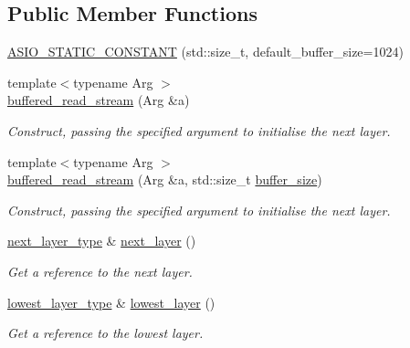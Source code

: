 \subsection*{Public Member Functions}
\begin{DoxyCompactItemize}
\item 
\hyperlink{classasio_1_1buffered__read__stream_a7a7cb4bdb0748fc23cd2cc8d16113d1c}{A\+S\+I\+O\+\_\+\+S\+T\+A\+T\+I\+C\+\_\+\+C\+O\+N\+S\+T\+A\+N\+T} (std\+::size\+\_\+t, default\+\_\+buffer\+\_\+size=1024)
\item 
{\footnotesize template$<$typename Arg $>$ }\\\hyperlink{classasio_1_1buffered__read__stream_a757e3802dbcd57836a744479fd5dc1f1}{buffered\+\_\+read\+\_\+stream} (Arg \&a)
\begin{DoxyCompactList}\small\item\em Construct, passing the specified argument to initialise the next layer. \end{DoxyCompactList}\item 
{\footnotesize template$<$typename Arg $>$ }\\\hyperlink{classasio_1_1buffered__read__stream_a5c3e4794b3e4e9a2ec17f0f045191dc3}{buffered\+\_\+read\+\_\+stream} (Arg \&a, std\+::size\+\_\+t \hyperlink{group__buffer__size_gabe8b5f116fbb66004b6d0ba8ee39c3d5}{buffer\+\_\+size})
\begin{DoxyCompactList}\small\item\em Construct, passing the specified argument to initialise the next layer. \end{DoxyCompactList}\item 
\hyperlink{classasio_1_1buffered__read__stream_a9f1f181db6c3207bd4c1c8fe6642d531}{next\+\_\+layer\+\_\+type} \& \hyperlink{classasio_1_1buffered__read__stream_a49445958f63af16e7f909dd45405bc11}{next\+\_\+layer} ()
\begin{DoxyCompactList}\small\item\em Get a reference to the next layer. \end{DoxyCompactList}\item 
\hyperlink{classasio_1_1buffered__read__stream_a041a7cecfeb013857bd1839dcd43de49}{lowest\+\_\+layer\+\_\+type} \& \hyperlink{classasio_1_1buffered__read__stream_ae9f3cde1deefd642768b2b4fe808774c}{lowest\+\_\+layer} ()
\begin{DoxyCompactList}\small\item\em Get a reference to the lowest layer. \end{DoxyCompactList}\item 

\end{DoxyCompactItemize}
